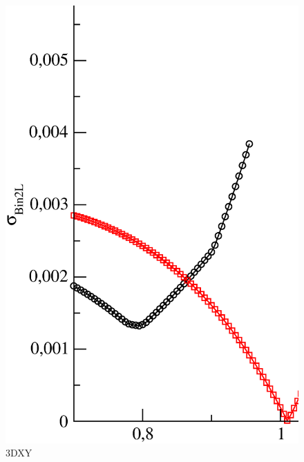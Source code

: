 \begin{figure}[!htpb]
  \centering
  \includegraphics[width=15cm]{./plots/3DXY/std_intersect_Bin_vs_omega.eps}
  \caption{3DXY}
\end{figure}

